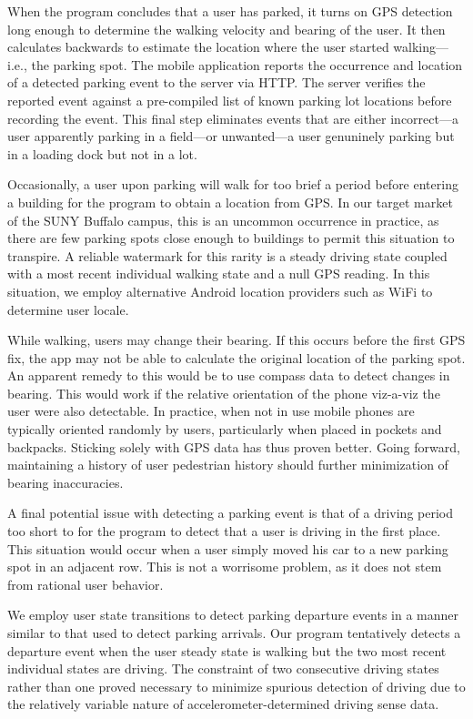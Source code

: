 When the program concludes that a user has parked, it turns on GPS detection
long enough to determine the walking velocity and bearing of the user.  It
then calculates backwards to estimate the location where the user started
walking---i.e., the parking spot.  The mobile application reports the
occurrence and location of a detected parking event to the server via HTTP.
The server verifies the reported event against a pre-compiled list of known
parking lot locations before recording the event.  This final step eliminates
events that are either incorrect---a user apparently parking in a field---or
unwanted---a user genuninely parking but in a loading dock but not in a lot.

Occasionally, a user upon parking will walk for too brief a period before
entering a building for the program to obtain a location from GPS.  In our
target market of the SUNY Buffalo campus, this is an uncommon occurrence in
practice, as there are few parking spots close enough to buildings to permit
this situation to transpire.  A reliable watermark for this rarity is a
steady driving state coupled with a most recent individual walking state and
a null GPS reading.  In this situation, we employ alternative Android
location providers such as WiFi to determine user locale.

While walking, users may change their bearing.  If this occurs before the
first GPS fix, the app may not be able to calculate the original location
of the parking spot.  An apparent remedy to this would be to use compass
data to detect changes in bearing.  This would work if the relative
orientation of the phone viz-a-viz the user were also detectable.  In
practice, when not in use mobile phones are typically oriented randomly by
users, particularly when placed in pockets and backpacks.  Sticking solely
with GPS data has thus proven better.  Going forward, maintaining a history
of user pedestrian history should further minimization of bearing
inaccuracies.

A final potential issue with detecting a parking event is that of a driving
period too short to for the program to detect that a user is driving in
the first place.  This situation would occur when a user simply moved his
car to a new parking spot in an adjacent row.  This is not a worrisome
problem, as it does not stem from rational user behavior.

We employ user state transitions to detect parking departure events in a 
manner similar to that used to detect parking arrivals.  Our program
tentatively detects a departure event when the user steady state is walking
but the two most recent individual states are driving.  The constraint of
two consecutive driving states rather than one proved necessary to minimize
spurious detection of driving due to the relatively variable nature of
accelerometer-determined driving sense data.

